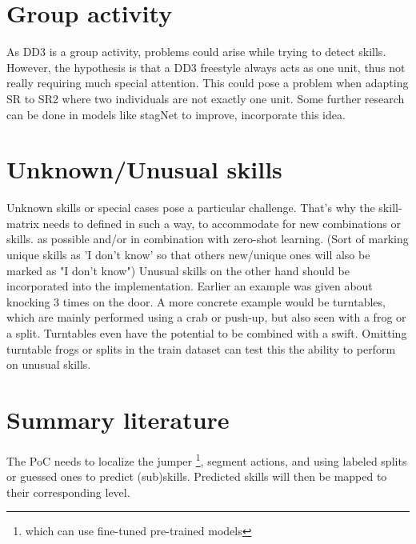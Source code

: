 \section{Group activity}

As DD3 is a group activity, problems could arise while trying to detect skills. However, the hypothesis is that a DD3 freestyle always acts as one unit, thus not really requiring much special attention. This could pose a problem when adapting SR to SR2 where two individuals are not exactly one unit. Some further research can be done in models like stagNet \autocite{Qi_2020} to improve, incorporate this idea.

\section{Unknown/Unusual skills}
\label{subsec:bp-literature-unknown-unusual-skills}

Unknown skills or special cases pose a particular challenge. That’s why the skill-matrix needs to defined in such a way, to accommodate for new combinations or skills.
as possible and/or in combination with zero-shot learning. (Sort of marking unique skills as ’I don’t know’ so that others new/unique ones will also be marked as "I don't know") Unusual skills on the other hand should be incorporated into the implementation.
Earlier an example was given about knocking 3 times on the door. A more concrete example would be turntables, which are mainly performed using a crab or push-up, but also seen with a frog or a split.
Turntables even have the potential to be combined with a swift. Omitting turntable frogs or splits in the train dataset can test this the ability to perform on unusual skills.

\section{Summary literature}
\label{subsec:bp-summary literature}

The PoC needs to localize the jumper \footnote{which can use fine-tuned pre-trained models}, segment actions, and using labeled splits or guessed ones to predict (sub)skills.
Predicted skills will then be mapped to their corresponding level.
